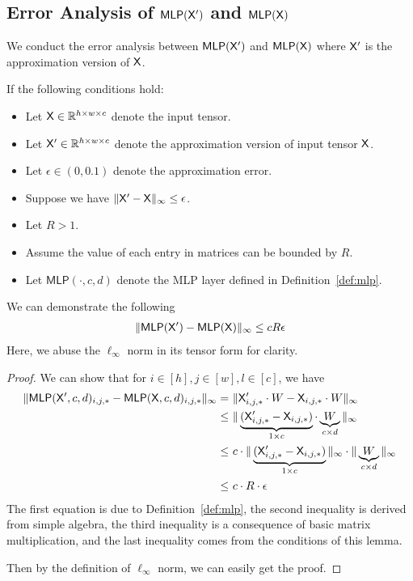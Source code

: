 \subsection{Error Analysis of \texorpdfstring{$\mathsf{MLP}(\mathsf{X}')$}{} and \texorpdfstring{$\mathsf{MLP}(\mathsf{X})$}{}}\label{sec:error_analysis_of_mlp_x_prime_mlp_x}
We conduct the error analysis between $\mathsf{MLP}(\mathsf{X}')$ and $\mathsf{MLP}(\mathsf{X})$ where $\mathsf{X}'$ is the approximation version of $\mathsf{X}$.
\begin{lemma}\label{lem:error_analysis_mlp}
    If the following conditions hold:
    \begin{itemize}
        \item Let $\mathsf{X} \in \mathbb{R}^{h \times w \times c}$ denote the input tensor.
        \item Let $\mathsf{X}' \in \mathbb{R}^{h \times w \times c}$ denote the approximation version of input tensor $\mathsf{X}$.
        \item Let $\epsilon \in (0, 0.1)$ denote the approximation error. 
        \item Suppose we have $\| \mathsf{X}' - \mathsf{X} \|_\infty \leq \epsilon$.
        \item Let $R > 1$.
        \item Assume the value of each entry in matrices can be bounded by $R$.  
        \item Let $\mathsf{MLP}(\cdot,c,d)$ denote the MLP layer defined in Definition~\ref{def:mlp}.
    \end{itemize}
    We can demonstrate the following
    \begin{align*}
        \|\mathsf{MLP}(\mathsf{X}') - \mathsf{MLP}(\mathsf{X})\|_\infty \leq cR\epsilon
    \end{align*}
    Here, we abuse the $\ell_\infty$ norm in its tensor form for clarity.
\end{lemma}
\begin{proof}
    We can show that for $i \in [h],j \in [w], l \in [c]$, we have
    \begin{align*}
        \|\mathsf{MLP}(\mathsf{X}',c,d)_{i,j,*} - \mathsf{MLP}(\mathsf{X},c,d)_{i,j,*}\|_\infty =&~ \| \mathsf{X}'_{i,j,*}\cdot W - \mathsf{X}_{i,j,*} \cdot W \|_\infty\\
        \leq&~ \|\underbrace{(\mathsf{X}'_{i,j,*}-\mathsf{X}_{i,j,*})}_{1 \times c} \cdot \underbrace{W}_{c\times d} \|_\infty \\
        \leq &~ c \cdot \|\underbrace{(\mathsf{X}'_{i,j,*}-\mathsf{X}_{i,j,*})}_{1 \times c}\|_\infty \cdot \|\underbrace{W}_{c\times d} \|_\infty\\
        \leq&~ c \cdot R \cdot \epsilon
    \end{align*}
    The first equation is due to Definition~\ref{def:mlp}, the second inequality is derived from simple algebra, the third inequality is a consequence of basic matrix multiplication, and the last inequality comes from the conditions of this lemma.

    Then by the definition of $\ell_\infty$ norm, we can easily get the proof.
\end{proof}



